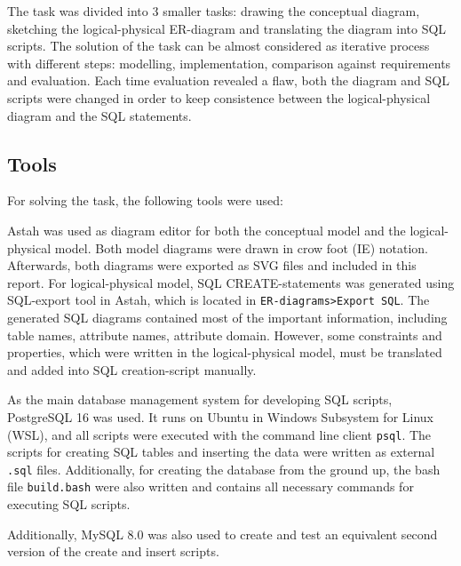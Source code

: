 \documentclass[a4paper]{scrartcl}
\renewcommand{\_}{\textunderscore\allowbreak}
\begin{document}

The task was divided into 3 smaller tasks: drawing the conceptual diagram, sketching the logical-physical ER-diagram and translating the diagram into SQL scripts. The solution of the task can be almost considered as iterative process with different steps: modelling, implementation, comparison against requirements and evaluation. Each time evaluation revealed a flaw, both the diagram and SQL scripts were changed in order to keep consistence between the logical-physical diagram and the SQL statements.

\subsection{Tools}

For solving the task, the following tools were used:

Astah was used as diagram editor for both the conceptual model and the logical-physical model. Both model diagrams were drawn in crow foot (IE) notation. Afterwards, both diagrams were exported as SVG files and included in this report. For logical-physical model, SQL CREATE-statements was generated using SQL-export tool in Astah, which is located in \texttt{ER-diagrams>Export SQL}. The generated SQL diagrams contained most of the important information, including table names, attribute names, attribute domain. However, some constraints and properties, which were written in the logical-physical model, must be translated and added into SQL creation-script manually.

As the main database management system for developing SQL scripts, PostgreSQL 16 was used. It runs on Ubuntu in Windows Subsystem for Linux (WSL), and all scripts were executed with the command line client \texttt{psql}. The scripts for creating SQL tables and inserting the data were written as external \texttt{.sql} files. Additionally, for creating the database from the ground up, the bash file \texttt{build.bash} were also written and contains all necessary commands for executing SQL scripts.

Additionally, MySQL 8.0 was also used to create and test an equivalent second version of the create and insert scripts.
\end{document}
